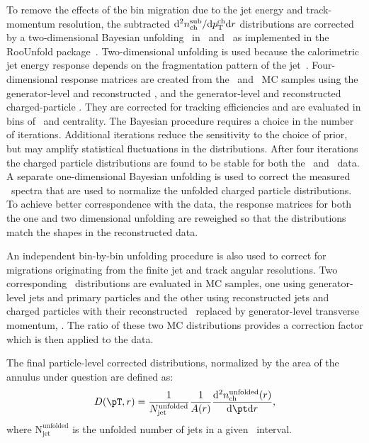 
To remove the effects of the bin migration due to the jet energy and track-momentum resolution, the subtracted $\mathrm{d}^2 \mbox{$n_{\mathrm{ch}}^{\mathrm{sub}}$} /\mathrm{d}\mbox{$p_{\mathrm{T}}^{\mathrm{ch}}$} \mathrm{d} r$ distributions are corrected by a two-dimensional Bayesian unfolding~\cite{DAgostini:1994zf}
in \pttrk\ and \ptjet\ as implemented in the RooUnfold package~\cite{Adye:2011gm}.  
Two-dimensional unfolding is used because the calorimetric jet energy response depends on the fragmentation pattern of the jet~\cite{Aad:2011he}.
Four-dimensional response matrices are created from the \pp\ and \pbpb\ MC samples using the generator-level and reconstructed \ptjet, and the generator-level and reconstructed charged-particle \pttrk. They are corrected for tracking efficiencies and are evaluated in bins of \rvar\ and centrality. The Bayesian procedure requires a choice in the number of iterations.
Additional iterations reduce the sensitivity to the choice of prior, but may
amplify statistical fluctuations in the distributions.
After four iterations the 
charged particle distributions are found to be stable for both the \PbPb\ and \pp\ data.
A separate one-dimensional Bayesian unfolding is used to correct the measured \ptjet\ spectra that are used to normalize the unfolded charged particle distributions.
To achieve better correspondence with the data, the response matrices for both the one and two dimensional unfolding are reweighed so that the distributions match the shapes in the reconstructed data.

An independent bin-by-bin unfolding procedure is also used to correct for migrations originating from the finite jet and track angular resolutions. Two corresponding \Dptr\ distributions are evaluated in MC samples, one using generator-level jets and primary particles and the other using reconstructed jets and charged particles with their reconstructed \pttrk\ replaced by generator-level transverse momentum, \pTtrue. The ratio of these two MC distributions provides a correction factor which is then applied to the data. 

The final particle-level corrected distributions, normalized by the area of the annulus under question are defined as:
\begin{eqnarray}
 \label{eq:Dpt}
   \Dptr = \frac{1}{N_\mathrm{jet}^\mathrm{unfolded}} \frac{1}{A(r)} \frac{\fd^2 \nchunf(r)}{\fd \pt \fd r},
 \end{eqnarray}
where $\text{N}_{\text{jet}}^{\text{unfolded}}$ is the unfolded number of jets in a given \ptjet\ interval.

